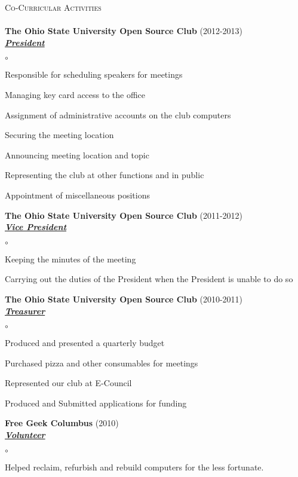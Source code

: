\documentclass{article}
\newcommand{\lineunder}{\vspace*{-8pt} \\ \hspace*{-18pt} \hrulefill \\}
\newcommand{\header}[1]{{\hspace*{-15pt}\vspace*{6pt} \textsc{#1}} \vspace*{-6pt} \lineunder}
\newcommand{\organization}[3]{{ \textbf{#1} (#2)\\ \underline{\textbf{\emph{#3}}}\\  }}
\newenvironment{achievements}{\begin{list}{$\circ$}{\topsep 0pt \itemsep -2pt}}{\vspace*{4pt}\end{list}}
\begin{document}
\header{Co-Curricular Activities}
\organization{The Ohio State University Open Source Club}{2012-2013}{President}
	\begin{achievements}
	\item Responsible for scheduling speakers for meetings
	\item Managing key card access to the office
	\item Assignment of administrative accounts on the club computers
	\item Securing the meeting location
	\item Announcing meeting location and topic
	\item Representing the club at other functions and in public
	\item Appointment of miscellaneous positions
	\end{achievements}

\organization{The Ohio State University Open Source Club}{2011-2012}{Vice President}
	\begin{achievements}
	\item Keeping the minutes of the meeting
	\item Carrying out the duties of the President when the President is unable to do so
	\end{achievements}

\organization{The Ohio State University Open Source Club}{2010-2011}{Treasurer}
	\begin{achievements}
	\item Produced and presented a quarterly budget
	\item Purchased pizza and other consumables for meetings
	\item Represented our club at E-Council
	\item Produced and Submitted applications for funding
	\end{achievements}

\organization{Free Geek Columbus}{2010}{Volunteer}
	\begin{achievements}
	\item Helped reclaim, refurbish and rebuild computers for the less fortunate.
	\end{achievements}
\end{document}
